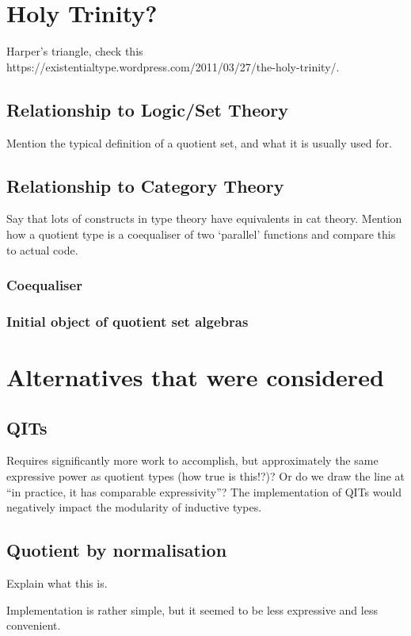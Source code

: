 \documentclass[11pt]{article}
\begin{document}
\section{Holy Trinity?}
Harper's triangle, check this https://existentialtype.wordpress.com/2011/03/27/the-holy-trinity/.

\subsection{Relationship to Logic/Set Theory}
Mention the typical definition of a quotient set, and what it is usually used for.

\subsection{Relationship to Category Theory}
Say that lots of constructs in type theory have equivalents in cat theory. Mention how a quotient type is a coequaliser of two `parallel' functions and compare this to actual code.


\subsubsection{Coequaliser}

\subsubsection{Initial object of quotient set algebras}

\section{Alternatives that were considered}
\subsection{QITs}
Requires significantly more work to accomplish, but approximately the same expressive power as quotient types (how true is this!?)? Or do we draw the line at ``in practice, it has comparable expressivity''?
The implementation of QITs would negatively impact the modularity of inductive types.

\subsection{Quotient by normalisation}
Explain what this is.

Implementation is rather simple, but it seemed to be less expressive and less convenient.
\end{document}

